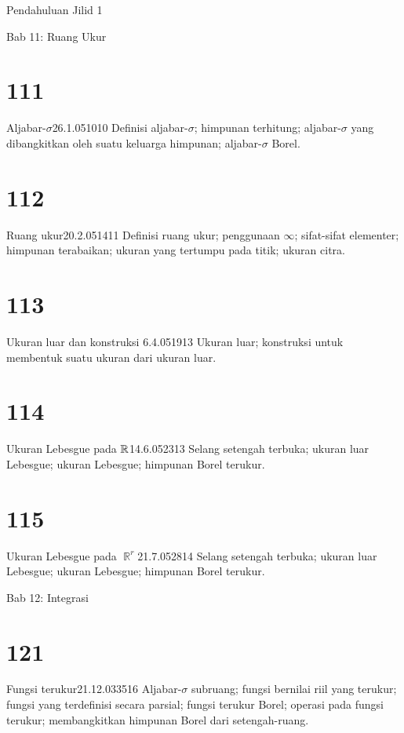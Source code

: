 
Pendahuluan Jilid 1 

\medskip

Bab 11:  Ruang Ukur


\section{111}{Aljabar-$\sigma$}{26.1.05}{10}{10}
{Definisi aljabar-$\sigma$;  himpunan terhitung;
aljabar-$\sigma$ yang dibangkitkan oleh suatu keluarga himpunan;  
aljabar-$\sigma$ Borel.}

\section{112}{Ruang ukur}{20.2.05}{14}{11}
{Definisi ruang ukur;  penggunaan $\infty$;  sifat-sifat
elementer;  himpunan terabaikan;  ukuran yang tertumpu pada
titik;  ukuran citra.}

\section{113}{Ukuran luar dan konstruksi \Caratheodory}
{6.4.05}{19}{13}
{Ukuran luar;  konstruksi \Caratheodory untuk membentuk suatu ukuran dari
ukuran luar.}

\section{114}{Ukuran Lebesgue pada $\Bbb{R}$}{14.6.05}{23}{13}
{Selang setengah terbuka;  ukuran luar Lebesgue;  ukuran Lebesgue;
himpunan Borel terukur.}

\section{115}{Ukuran Lebesgue pada $\BbbR^r$}{21.7.05}{28}{14}
{Selang setengah terbuka;  ukuran luar Lebesgue;  ukuran Lebesgue;
himpunan Borel terukur.}

\medskip

 Bab 12:  Integrasi


\section{121}{Fungsi terukur}{21.12.03}{35}{16}
{Aljabar-$\sigma$ subruang;  fungsi bernilai riil yang terukur;
fungsi yang terdefinisi secara parsial;  fungsi terukur Borel;  operasi pada
fungsi terukur;  membangkitkan himpunan Borel dari setengah-ruang.}

